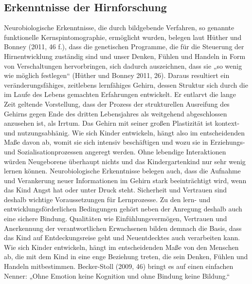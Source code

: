 \subsection{Erkenntnisse der Hirnforschung}
Neurobiologische Erkenntnisse, die durch bildgebende Verfahren, so genannte funktionelle Kernspintomographie, ermöglicht wurden,
belegen laut Hüther und Bonney (2011, 46 f.), dass die genetischen Programme, die für die Steuerung der Hirnentwicklung zuständig sind und unser Denken, Fühlen und Handeln in Form von Verschaltungen hervorbringen, sich dadurch auszeichnen, dass sie „so wenig wie möglich festlegen“ (Hüther und Bonney 2011, 26). Daraus resultiert ein veränderungsfähiges, zeitlebens lernfähiges Gehirn, dessen Struktur sich durch die im Laufe des Lebens gemachten Erfahrungen entwickelt. Er entlarvt die lange Zeit geltende Vorstellung, dass der Prozess der strukturellen Ausreifung des Gehirns gegen Ende des dritten Lebensjahres als weitgehend abgeschlossen anzusehen ist, als Irrtum. Das Gehirn mit seiner großen Plastizität ist kontext- und nutzungsabhänig. Wie sich Kinder entwickeln, hängt also im entscheidenden Maße davon ab, womit sie sich intensiv beschäftigen und wozu sie in Erziehungs- und Sozialisationprozessen angeregt werden. Ohne lebendige Interaktionen würden Neugeborene überhaupt nichts und das Kindergartenkind nur sehr wenig lernen können. Neurobiologische Erkenntnisse belegen auch, dass die Aufnahme und Verankerung neuer Informationen im Gehirn stark beeinträchtigt wird, wenn das Kind Angst hat oder unter Druck steht. Sicherheit und Vertrauen sind deshalb wichtige Voraussetzungen für Lernprozesse. Zu den lern- und entwicklungsförderlichen Bedingungen gehört neben der Anregung deshalb 
auch eine sichere Bindung. Qualitäten wie Einfühlungsvermögen, Vertrauen und Anerkennung der verantwortlichen Erwachsenen bilden demnach die Basis, dass das Kind auf Entdeckungsreise geht und Neuentdecktes auch verarbeiten kann. Wie sich Kinder entwickeln, hängt im entscheidenden Maße von den Menschen ab, die mit dem Kind in eine enge Beziehung treten, die sein Denken, Fühlen und Handeln mitbestimmen.
Becker-Stoll (2009, 46) bringt es auf einen einfachen Nenner: „Ohne Emotion keine Kognition und ohne Bindung keine Bildung.“ 

